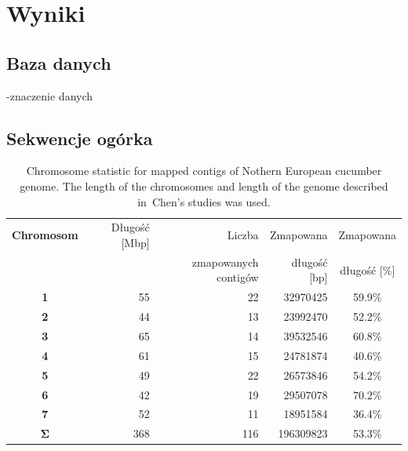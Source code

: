 \chapter{Wyniki}

\section{Baza danych}
-znaczenie danych

\section{Sekwencje ogórka}

\begin{table}
	\centering
	\begin{tabular}{|c||r|r|r|c|} \hline
		\textbf{Chromosom}    & Długość [Mbp] & Liczba & Zmapowana & Zmapowana \\
		& & zmapowanych contigów & długość [bp] & długość [\%] \\
		\hline
		\textbf{1}             & 55                 &  22                 &  32970425          & 59.9\%               \\
		\textbf{2}             & 44                 &  13                 &  23992470          & 52.2\%               \\
		\textbf{3}             & 65                 &  14                 &  39532546          & 60.8\%               \\
		\textbf{4}             & 61                 &  15                 &  24781874          & 40.6\%               \\
		\textbf{5}             & 49                 &  22                 &  26573846          & 54.2\%               \\
		\textbf{6}             & 42                 &  19                 &  29507078          & 70.2\%               \\
		\textbf{7}             & 52                 &  11                 &  18951584          & 36.4\%               \\
		\hline
		$\mathbf{\Sigma}$      &368                 & 116                 & 196309823          &  53.3\%              \\
		\hline
	\end{tabular}
	\caption{Chromosome statistic for mapped contigs of Nothern European cucumber genome.
		The length of the chromosomes and length of the genome described in~Chen's studies\cite{article:reevaluation_in_cucumber} was used.}
	\label{tab:genome_stat}
\end{table}

